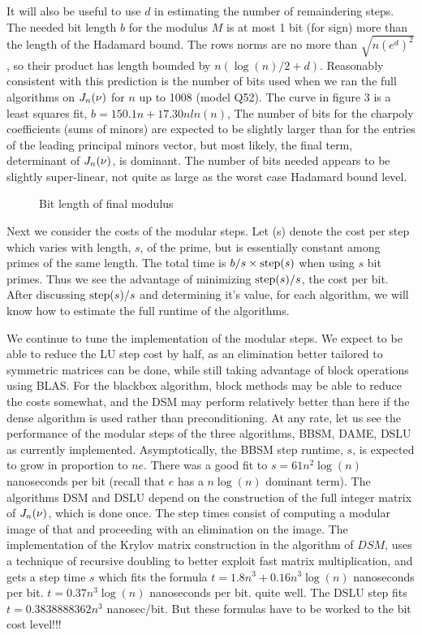 \documentclass{acm_proc_article-sp}
\begin{document}
It will also be useful to use $d$ in estimating the number of remaindering steps.
The needed bit length $b$ for the modulus $M$ is at most 1 bit (for sign) more 
than the length of the Hadamard bound.  The rows norms are no more than \(\sqrt{n(e^d)^2}\),
so their product has length bounded by $n(\log(n)/2 + d)$.
Reasonably consistent with this prediction is the number of bits used when we ran
the full algorithms on $J_{n}({\nu})$ for $n$ up to 1008 (model Q52).  
The curve in figure 3 is a least squares fit,
$b = 150.1 n + 17.30n ln(n)$,
The number of bits for the charpoly coefficients (sums of minors) are expected 
to be slightly larger than for the entries of the  leading principal minors vector,
but most likely, the final term, determinant of $J_{n}({\nu})$, is dominant.  
The number of bits needed appears to be slightly super-linear, not quite as large as
the worst case Hadamard bound level.  
\begin{figure}[h] %
\caption{Bit length of final modulus}
\end{figure}

Next we consider the costs of the modular steps.
Let \step(s) denote the cost per step which varies with length, $s$, of the prime, 
but is essentially constant among primes of the same length.
The total time  is $b/s \times \mbox{step}(s)$ when using $s$ bit primes. 
Thus we see the advantage of minimizing $\mbox{step}(s)/s$, the cost per bit.
After discussing $\mbox{step}(s)/s$ and determining it's value, for each algorithm,  
we will know how to estimate the full runtime of the algorithms.

We continue to tune the implementation of the modular steps.
We expect to be able to reduce the LU step cost
by half, as an elimination better tailored to symmetric matrices can be done, while still taking
advantage of block operations using BLAS. For the blackbox algorithm, block methods may 
be able to reduce the costs somewhat, and the DSM may perform relatively better than
here if the dense \charpoly{} algorithm \cite{Pernet03} %
is used rather than preconditioning.
At any rate, let us see the performance of the modular steps of the three algorithms,
BBSM, DAME, DSLU as currently implemented.
Asymptotically, the BBSM step runtime, $s$, is expected to grow in
proportion to $ne$. There was a good fit to $s = 61 n^2\log(n)$ nanoseconds per bit
(recall that $e$ has a $n\log(n)$ dominant term).
The algorithms DSM and DSLU depend on the construction of the full integer matrix of 
$J_{n}({\nu})$, which is done once.  The step times consist of computing a modular
image of that and proceeding with an elimination on the image.
The implementation of the Krylov matrix construction in the \minpoly{} algorithm of $DSM$,
uses a technique of recursive doubling to better exploit fast matrix multiplication,
and gets a step time $s$ which fits the formula 
$t = 1.8   n^3  + 0.16  n^3 \log(n)$ nanoseconds per bit.
$t = 0.37 n^3 \log(n)$ nanoseconds per bit.
quite well.  
The DSLU step fits 
$t = 0.3838888362 n^3$ nanosec/bit.
But these formulas have to be worked to the bit cost level!!!
\end{document}
